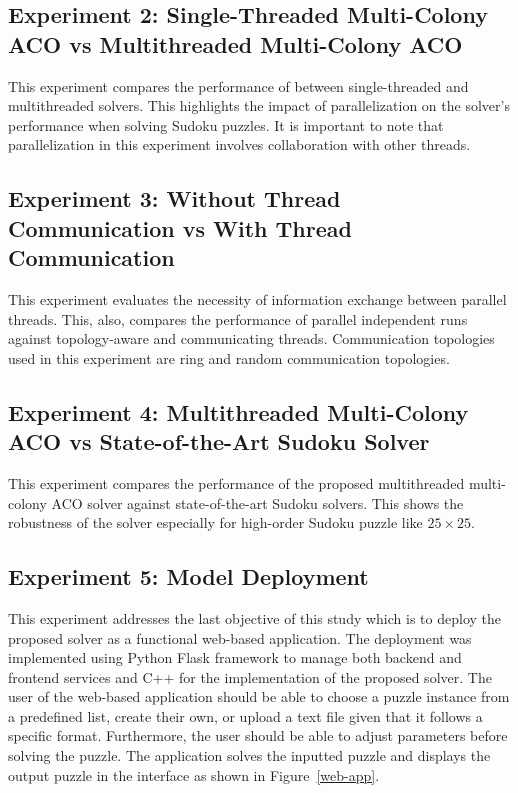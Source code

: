 \subsection{Experiment 2: Single-Threaded Multi-Colony ACO vs Multithreaded Multi-Colony ACO} 
	This experiment compares the performance of between single-threaded and multithreaded solvers. This highlights the impact of parallelization on the solver’s performance when solving Sudoku puzzles. It is important to note that parallelization in this experiment involves collaboration with other threads. 

\subsection{Experiment 3: Without Thread Communication vs With Thread Communication}
        This experiment evaluates the necessity of information exchange between parallel threads. This, also, compares the performance of parallel independent runs against topology-aware and communicating threads. Communication topologies used in this experiment are ring and random communication topologies. 

\subsection{Experiment 4: Multithreaded Multi-Colony ACO vs State-of-the-Art Sudoku Solver}
        This experiment compares the performance of the proposed multithreaded multi-colony ACO solver against state-of-the-art Sudoku solvers. This shows the robustness of the solver especially for high-order Sudoku puzzle like $25 \times 25$.  

\subsection{Experiment 5: Model Deployment}
	This experiment addresses the last objective of this study which is to deploy the proposed solver as a functional web-based application. The deployment was implemented using Python Flask framework to manage both backend and frontend services and C++ for the implementation of the proposed solver. 
	The user of the web-based application should be able to choose a puzzle instance from a predefined list, create their own, or upload a text file given that it follows a specific format. Furthermore, the user should be able to adjust parameters before solving the puzzle. The application solves the inputted puzzle and displays the output puzzle in the interface as shown in Figure~\ref{web-app}.  

